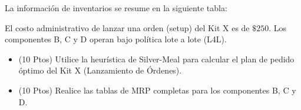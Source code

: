 \documentclass[11pt, a4paper]{article}
\begin{document}
  La información de inventarios se resume en la siguiente tabla:
  \begin{center}
  \end{center}

  El costo administrativo de lanzar una orden (setup) del Kit X es de $\$250$. Los componentes B, C y D operan bajo política lote a lote (L4L).

  \begin{itemize}
    \item[\textbf{a)}] (10 Ptos) Utilice la heurística de Silver-Meal para calcular el plan de pedido óptimo del Kit X (Lanzamiento de Órdenes).
    \item[\textbf{b)}] (10 Ptos) Realice las tablas de MRP completas para los componentes B, C y D.
  \end{itemize}
\end{document}
